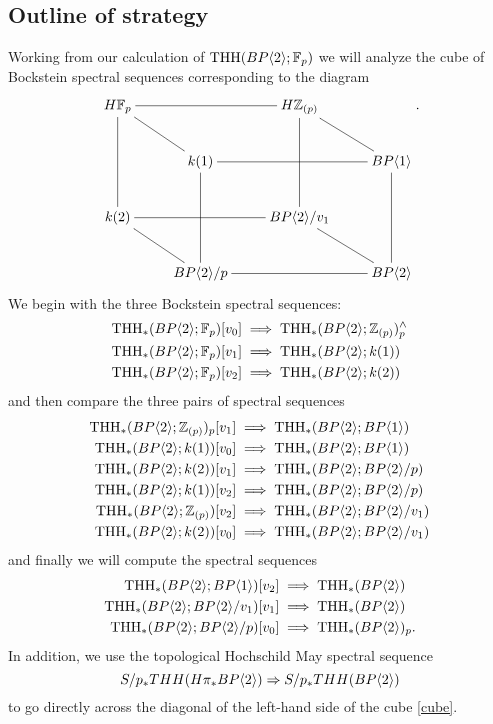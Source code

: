 \subsection{Outline of strategy}
Working from our calculation of $\THH(\B;\F_p)$ we will analyze the cube of Bockstein spectral sequences corresponding to the diagram
\begin{equation}\label{cube}
\xymatrix{ 
H\F_p  \ar@{-}[rd] \ar@{-}[dd] \ar@{-}[rr] & & H\Z_{(p)} \ar@{-}[rd] \ar@{-}[dd] & \\
 & k(1)  \ar@{-}[dd] \ar@{-}[rr] & & \tBP{1} \ar@{-}[dd]  \\
k(2)   \ar@{-}[dr] \ar@{-}[rr] & &\B/v_1  \ar@{-}[dr] & \\
 & \B/p \ar@{-}[rr] & & \B  } .   
 \end{equation}
We begin with the three Bockstein spectral sequences:
\begin{align}
	\label{v_0BSS}\THH_*(\B;\F_p)[v_0]&\implies \THH_*(\B;\Z_{(p)})^{\wedge}_p\\
	\label{v_1BSS}\THH_*(\B;\F_p)[v_1]&\implies \THH_*(\B;k(1))\\
	\label{v_2BSS}\THH_*(\B;\F_p)[v_2]&\implies \THH_*(\B;k(2))
\end{align}
and then compare the three pairs of spectral sequences 
\begin{align}
	\label{v_0v_1BSS}\THH_*(\B;\Z_{(p)})_p[v_1]&\implies \THH_*(\B;\tBP{1})\\
		\label{v_1v_0BSS}\THH_*(\B;k(1))[v_0]&\implies \THH_*(\B;\tBP{1})\\
	\label{v_2v_1BSS}\THH_*(\B;k(2))[v_1]&\implies \THH_*(\B;\B/p)\\
	\label{v_1v_2BSS}\THH_*(\B;k(1))[v_2]&\implies \THH_*(\B;\B/p)\\
	\label{v_0v_2BSS}\THH_*(\B;\Z_{(p)})[v_2]&\implies \THH_*(\B;\B/v_1)\\
	\label{v_2v_0BSS}\THH_*(\B;k(2))[v_0]&\implies \THH_*(\B;\B/v_1)
\end{align}
and finally we will compute the spectral sequences 
\begin{align}
	\label{v_0v_1v_2BSS}\THH_*(\B;\tBP{1})[v_2]&\implies \THH_*(\B)\\
	\label{v_0v_2v_1BSS}\THH_*(\B;\B/v_1)[v_1]&\implies \THH_*(\B)\\
	\label{v_1v_2v_0BSS}\THH_*(\B;\B/p)[v_0]&\implies \THH_*(\B)_p.
\end{align}
In addition, we use the topological Hochschild May spectral sequence 
\[ S/p_*THH(H\pi_*\B)\Rightarrow S/p_*THH(\B) \]
to go directly across the diagonal of the left-hand side of the cube \eqref{cube}. 

